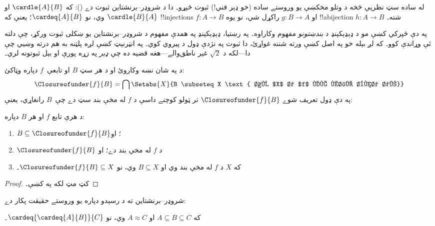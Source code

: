\documentclass[../../../include/open-logic-section]{subfiles}
\begin{document}


له ساده سټ نظريې څخه د وتلو مخکښې يو وروستے ساده (خو ډېر فني!)
ثبوت څېړو۔ دا د شروډر--برنشتاين ثبوت دے
(): که
$\cardle{A}{B}$ او $\cardle{B}{A}$ وي، نو $\cardeq{A}{B}$؛ يعنې که
!!{injection}s $f \colon A \to B$ او $g \colon B \to A$ راکړل
شي، نو يوه !!a{bijection} $h \colon A \to B$ شته۔

په دې څپرکي کښې مو د ډېډېکېنډ د \emph{بندښتونو} مفهوم وکاراوه۔ په
رښتيا، ډېډېکېنډ په همدې مفهوم د شروډر--برنشتاين يو ښکلی ثبوت ورکړ،
چې دلته ئې وړاندې کوو۔ که لږ بېله خو په اصل کښې ورته شننه غواړئ،
دا ثبوت په نژدې ډول د \citet[pp.~157--8]{Potter2004} پيروي کوي۔
په انټرنېټ کښې لږه پلټنه به هم درته وښيي چې دا---لکه د
$\sqrt{2}$ غير ناطق‌والے---هغه قضيه ده چې \emph{ډېر} په زړه پورې
او بېل ثبوتونه لري۔

د  په شان نښه وکاروئ او د
هر سټ $B$ او تابعې~$f$ دپاره وټاکئ:
\[
\Closureofunder{f}{B} = \bigcap \Setabs{X}{B \subseteq X
\text{ او $X$ د $f$ له مخې بند دے}}
\]
په دې ډول تعريف شوے $\Closureofunder{f}{B}$ تر ټولو کوچنے داسې د
$f$ له مخې بند سټ دے چې~$B$ رانغاړي، يعنې:

\begin{lem}
	د هرې تابع $f$ او هر $B$ دپاره:
	\begin{enumerate}
		\item{} $B \subseteq \Closureofunder{f}{B}$؛ او
		\item{} $\Closureofunder{f}{B}$ د $f$ له مخې بند دے؛ او
		\item{} که $X$ د $f$ له مخې بند وي او $B
		\subseteq X$ وي، نو $\Closureofunder{f}{B} \subseteq X$۔
	\end{enumerate}
\end{lem}

\begin{proof}
کټ مټ لکه په  کښې۔
\end{proof}

شروډر--برنشتاين ته د رسېدو دپاره يو وروستے حقيقت پکار دے:

\begin{prop}
که $A \subseteq B \subseteq C$ او $A \approx C$ وي، نو $\cardeq{\cardeq{A}{B}}{C}$۔
\end{prop}
\end{document}
